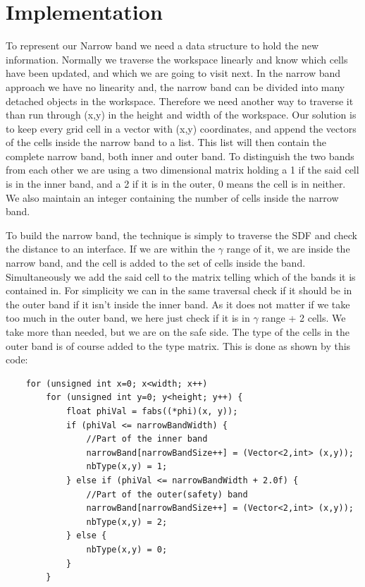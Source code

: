 \section{Implementation}
To represent our Narrow band we need a data structure to hold the new
information. Normally we traverse the workspace linearly and know
which cells have been updated, and which we are going to visit
next. In the narrow band approach we have no linearity and, the narrow
band can be divided into many detached objects in the
workspace. Therefore we need another way to traverse it than run
through (x,y) in the height and width of the workspace. Our solution is
to keep every grid cell in a vector with (x,y) coordinates, and append the
vectors of the cells inside the narrow band to a list. This list will
then contain the complete narrow band, both inner and outer band. To
distinguish the two bands from each other we are using a two dimensional matrix
holding a 1 if the said cell is in the inner band, and a 2 if it is
in the outer, 0 means the cell is in neither. We also maintain an
integer containing the number of cells inside the narrow band.

To build the narrow band, the technique is simply to traverse the SDF
and check the distance to an interface. If we are within the $\gamma$
range of it, we are inside the narrow band, and the cell is added to
the set of cells inside the band. Simultaneously  we add the said cell to
the matrix telling which of the bands it is contained in. For
simplicity we can in the same traversal check if it should be in the
outer band if it isn't inside the inner band. As it does not matter if
we take too much in the outer band, we here just check if it is in
$\gamma$ range + 2 cells. We take more than needed, but we are on the
safe side. The type of the cells in the outer band is of course added
to the type matrix. This is done as shown by this code:
\begin{lstlisting}
    for (unsigned int x=0; x<width; x++)
        for (unsigned int y=0; y<height; y++) {
            float phiVal = fabs((*phi)(x, y));
            if (phiVal <= narrowBandWidth) {
                //Part of the inner band
                narrowBand[narrowBandSize++] = (Vector<2,int> (x,y));
                nbType(x,y) = 1;
            } else if (phiVal <= narrowBandWidth + 2.0f) {
                //Part of the outer(safety) band
                narrowBand[narrowBandSize++] = (Vector<2,int> (x,y));
                nbType(x,y) = 2;
            } else {
                nbType(x,y) = 0;
            }
        }
\end{lstlisting}


